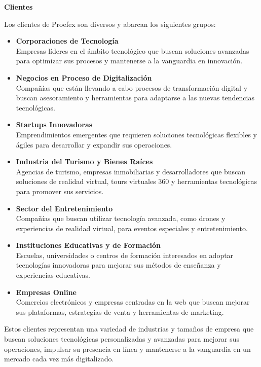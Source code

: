 \textbf{Clientes}

Los clientes de Proefex son diversos y abarcan los siguientes grupos:

\begin{itemize}
    \item \textbf{Corporaciones de Tecnología} \\
		Empresas líderes en el ámbito tecnológico que buscan soluciones avanzadas para optimizar
		sus procesos y mantenerse a la vanguardia en innovación.
	\item \textbf{Negocios en Proceso de Digitalización} \\
		Compañías que están llevando a cabo procesos de transformación digital y buscan asesoramiento
		y herramientas para adaptarse a las nuevas tendencias tecnológicas.
	\item \textbf{Startups Innovadoras}\\
		Emprendimientos emergentes que requieren soluciones tecnológicas flexibles y ágiles para desarrollar
		y expandir sus operaciones.
	\item \textbf{Industria del Turismo y Bienes Raíces} \\
		Agencias de turismo, empresas inmobiliarias y desarrolladores que buscan soluciones de
		realidad virtual, tours virtuales 360 y herramientas tecnológicas para promover sus servicios.
	\item \textbf{Sector del Entretenimiento} \\
        Compañías que buscan utilizar tecnología avanzada, como drones y experiencias de realidad virtual,
		para eventos especiales y entretenimiento.
	\item \textbf{Instituciones Educativas y de Formación} \\
		Escuelas, universidades o centros de formación interesados en adoptar tecnologías innovadoras para
		mejorar sus métodos de enseñanza y experiencias educativas. 
	\item \textbf{Empresas Online} \\
		Comercios electrónicos y empresas centradas en la web que buscan mejorar sus plataformas, estrategias
		de venta y herramientas de marketing.
\end{itemize}

Estos clientes representan una variedad de industrias y tamaños de empresa que buscan soluciones
tecnológicas personalizadas y avanzadas para mejorar sus operaciones, impulsar su presencia en
línea y mantenerse a la vanguardia en un mercado cada vez más digitalizado.

